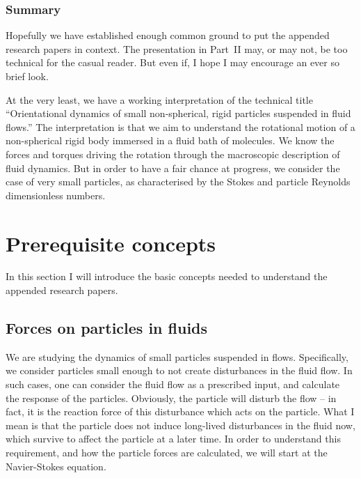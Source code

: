 \documentclass[thesis.tex]{subfiles}
\begin{document}
\subsection*{Summary}

Hopefully we have established enough common ground to put the appended research papers in context. The presentation in Part~II may, or may not, be too technical for the casual reader. But even if, I hope I may encourage an ever so brief look.

At the very least, we have a working interpretation of the technical title ``Orientational dynamics of small non-spherical, rigid particles suspended in fluid flows.'' The interpretation is that we aim to understand the rotational motion of a non-spherical rigid body immersed in a fluid bath of molecules. We know the forces and torques driving the rotation through the macroscopic description of fluid dynamics. But in order to have a fair chance at progress, we consider the case of very small particles, as characterised by the Stokes and particle Reynolds dimensionless numbers.


\chapter{Prerequisite concepts}

In this section I will introduce the basic concepts needed to understand the appended research papers. 

\section{Forces on particles in fluids}\label{sec:forces}

We are studying the dynamics of small particles suspended in flows. Specifically, we consider particles small enough to not create disturbances in the fluid flow. In such cases, one can consider the fluid flow as a prescribed input, and calculate the response of the particles. Obviously, the particle will disturb the flow -- in fact, it is the reaction force of this disturbance which acts on the particle.
What I mean is that the particle does not induce long-lived disturbances in the fluid now, which survive to affect the particle at a later time. In order to understand this requirement, and how the particle forces are calculated, we will start at the Navier-Stokes equation.
\end{document}

